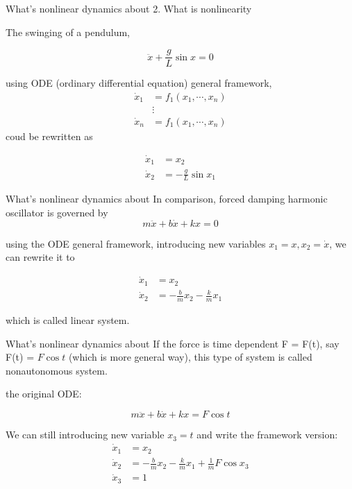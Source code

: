 \documentclass[9pt,aspectratio=43,mathserif,table]{beamer}
\begin{document}
\begin{frame}{What's nonlinear dynamics about}
    2. What is nonlinearity

    The swinging of a pendulum,

    \bigskip

    $$\ddot x + \frac{ g}{L} \sin x = 0$$

    using ODE (ordinary differential equation) general framework, 
    \begin{equation}
      \begin{aligned}
        \dot x_1 &= f_1(x_1, \cdots, x_n)\\
        &\vdots \\
        \dot x_n &= f_1(x_1, \cdots, x_n)
      \end{aligned}
    \end{equation}
    coud be rewritten as

    \begin{equation}
      \begin{aligned}
        \dot x_1 &= x_2 \\
        \dot x_2 &= - \frac{ g}{L} \sin x_1
      \end{aligned}
    \end{equation}
\end{frame}
\begin{frame}{What's nonlinear dynamics about}
   In comparison, forced damping harmonic oscillator is governed by
   $$m \ddot x + b \dot x + kx  = 0$$

   using the ODE general framework, introducing new variables $x_1 = x, x_2=\dot x$, we can rewrite it to

    \begin{equation}
      \begin{aligned}
        \dot x_1 &= x_2 \\
        \dot x_2 &= - \frac{ b}{m}x_2 - \frac{ k}{m} x_1
      \end{aligned}
    \end{equation}

   which is called linear system.
\end{frame}
\begin{frame}{What's nonlinear dynamics about}
   If the force is time dependent F = F(t), say F(t) = $F\cos t$ (which is more general way), this type of system is called nonautonomous system.  

   the original ODE:

   $$m \ddot x + b \dot x + kx  = F\cos t$$

   We can still introducing new variable $x_3 = t$ and write the framework version:
    \begin{equation}
      \begin{aligned}
        \dot x_1 &= x_2 \\
        \dot x_2 &= - \frac{ b}{m}x_2 - \frac{ k}{m} x_1 + \frac{1}{m} F\cos x_3 \\
        \dot x_3 &= 1 
      \end{aligned}
    \end{equation}
\end{frame}
\end{document}
